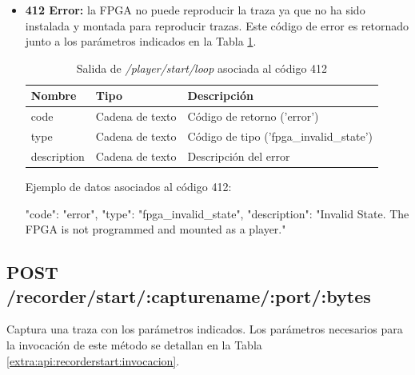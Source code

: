 \begin{itemize}
{\begin{minipage}{\textwidth}
Ejemplo de datos asociados al código 400:

\begin{code}[language=json]
{
  "code": "error",
  "type": "notification",
  "description": "Invalid parameters. The FPGA could not start playing a capture."
}
\end{code}
\end{minipage}
}

\item{\textbf{412 Error:} la \gls{FPGA} no puede reproducir la \gls{traza} ya que no ha sido instalada y montada para reproducir \glspl{traza}. Este código de error es retornado junto a los parámetros indicados en la Tabla \ref{extra:api:playerstartloop:error412}.
\begin{table}[H]
\centering
\begin{tabular}{|l|l|l|}
\hline
\rowcolor[HTML]{F5F5F5}
\textbf{Nombre}  & \textbf{Tipo}   & \textbf{Descripción}                    \\ \hline
code             & Cadena de texto & Código de retorno ('error')             \\ \hline
type             & Cadena de texto & Código de tipo ('fpga\_invalid\_state') \\ \hline
description      & Cadena de texto & Descripción del error                   \\ \hline
\end{tabular}
\caption{Salida de \textit{/player/start/loop} asociada al código 412}
\label{extra:api:playerstartloop:error412}
\end{table}

\begin{minipage}{\textwidth}
Ejemplo de datos asociados al código 412:

\begin{code}[language=json]
{
  "code": "error",
  "type": "fpga_invalid_state",
  "description": "Invalid State. The FPGA is not programmed and mounted as a player."
}
\end{code}
\end{minipage}
}

\end{itemize}

%
%
\subsection{POST /recorder/start/:capturename/:port/:bytes}
Captura una \gls{traza} con los parámetros indicados. Los parámetros necesarios para la invocación de este método se detallan en la Tabla \ref{extra:api:recorderstart:invocacion}.

